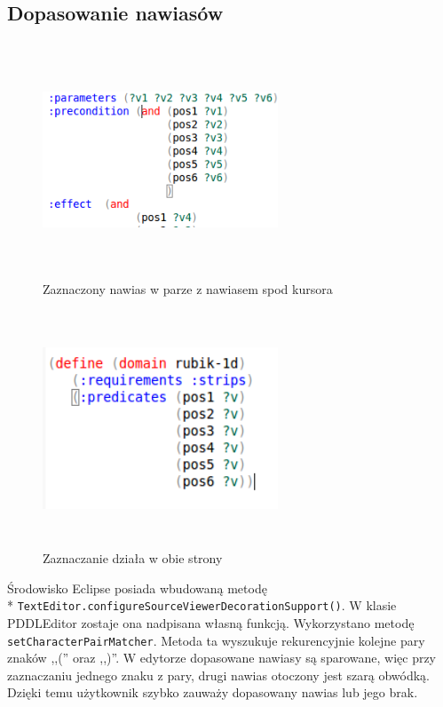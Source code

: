 \subsection{Dopasowanie nawiasów}
\begin{figure}[h]
  \centering
    \includegraphics[width=7cm,height=7cm,keepaspectratio]{img/matched-bracket.png}
    \caption{Zaznaczony nawias w parze z nawiasem spod kursora}
    \label{matched_bracket}
\end{figure}
\begin{figure}[h]
  \centering
    \includegraphics[width=7cm,height=7cm,keepaspectratio]{img/matched-bracket-reverse.png}
    \caption{Zaznaczanie działa w obie strony}
    \label{matched_bracket_reverse}
\end{figure}
Środowisko Eclipse posiada wbudowaną metodę\\* \texttt{TextEditor.configureSourceViewerDecorationSupport()}. W klasie PDDLEditor zostaje ona nadpisana własną funkcją. Wykorzystano metodę \texttt{setCharacterPairMatcher}. Metoda ta wyszukuje rekurencyjnie kolejne pary znaków ,,('' oraz ,,)''.  W edytorze dopasowane nawiasy są sparowane, więc przy zaznaczaniu jednego znaku z pary, drugi nawias otoczony jest szarą obwódką. Dzięki temu użytkownik szybko zauważy dopasowany nawias lub jego brak.
